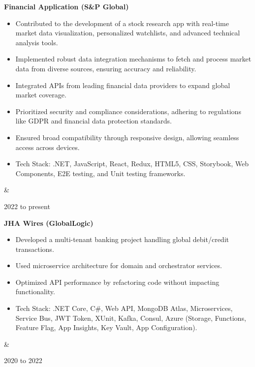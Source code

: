 \documentclass[10pt, letterpaper]{article}
\newenvironment{highlights}{
        \begin{itemize}[
                topsep=0pt,
                parsep=0.10cm,
                partopsep=0pt,
                itemsep=0pt,
                after=\vspace{-1\baselineskip},
                leftmargin=0.4cm + 3pt
            ]
    }{
        \end{itemize}
    } %
\let\originalTabularx\tabularx
\let\originalEndTabularx\endtabularx
\renewenvironment{tabularx}{\bgroup\centering\originalTabularx}{\originalEndTabularx\par\egroup}
\begin{document}
        \begin{tabularx}{
            \textwidth-0.4 cm-0.13cm
        }{
            K{0.2cm}
            R{4.1cm}
        }
            \textbf{Financial Application (S\&P Global)}

            \vspace{0.10cm}

            \begin{highlights}
                \item Contributed to the development of a stock research app with real-time market data visualization, personalized watchlists, and advanced technical analysis tools.
                \item Implemented robust data integration mechanisms to fetch and process market data from diverse sources, ensuring accuracy and reliability.
                \item Integrated APIs from leading financial data providers to expand global market coverage.
                \item Prioritized security and compliance considerations, adhering to regulations like GDPR and financial data protection standards.
                \item Ensured broad compatibility through responsive design, allowing seamless access across devices.
                \item Tech Stack: .NET, JavaScript, React, Redux, HTML5, CSS, Storybook, Web Components, E2E testing, and Unit testing frameworks.
            \end{highlights}
            &
            

            2022 to present
        \end{tabularx}


        \vspace{0.2cm}
        \begin{tabularx}{
            \textwidth-0.4 cm-0.13cm
        }{
            K{0.2cm}
            R{4.1cm}
        }
            \textbf{JHA Wires (GlobalLogic)}

            \vspace{0.10cm}

            \begin{highlights}
                \item Developed a multi-tenant banking project handling global debit/credit transactions.
                \item Used microservice architecture for domain and orchestrator services.
                \item Optimized API performance by refactoring code without impacting functionality.
                \item Tech Stack: .NET Core, C\#, Web API, MongoDB Atlas, Microservices, Service Bus, JWT Token, XUnit, Kafka, Consul, Azure (Storage, Functions, Feature Flag, App Insights, Key Vault, App Configuration).
            \end{highlights}
            &
            

            2020 to 2022
        \end{tabularx}
\end{document}
